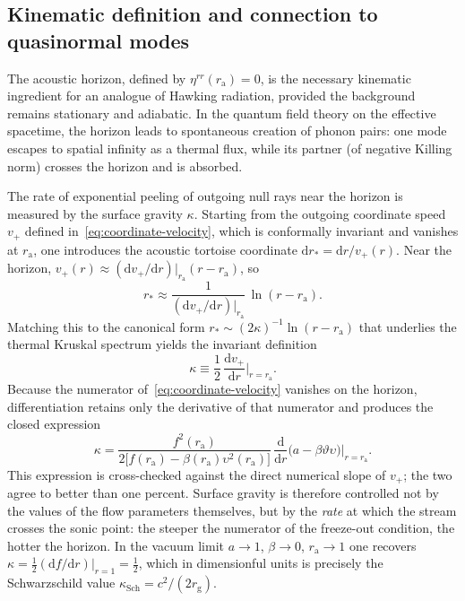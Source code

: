 \documentclass[12pt,a4paper,preprint]{elsarticle}
\begin{document}
        \subsection{Kinematic definition and connection to quasinormal modes}\label{subsec:kinematic-definition}
            The acoustic horizon, defined by $\eta^{rr}(r_{\mathrm{a}})=0$, is the necessary kinematic ingredient for an analogue of Hawking radiation, provided the background remains stationary and adiabatic. In the quantum field theory on the effective spacetime, the horizon leads to spontaneous creation of phonon pairs: one mode escapes to spatial infinity as a thermal flux, while its partner (of negative Killing norm) crosses the horizon and is absorbed.

            The rate of exponential peeling of outgoing null rays near the horizon is measured by the surface gravity $\kappa$. Starting from the outgoing coordinate speed $v_{+}$ defined in~\eqref{eq:coordinate-velocity}, which is conformally invariant and vanishes at $r_{\mathrm{a}}$, one introduces the acoustic tortoise coordinate $\mathrm{d}r_{*}=\mathrm{d}r/v_{+}(r)$. Near the horizon, $v_{+}(r)\approx (\mathrm{d}v_{+}/\mathrm{d}r)|_{r_{\mathrm{a}}}(r-r_{\mathrm{a}})$, so
            \begin{equation}
                r_{*} \approx \frac{1}{(\mathrm{d}v_{+}/\mathrm{d}r)|_{r_{\mathrm{a}}}}\,\ln(r-r_{\mathrm{a}}) .
                \label{eq:tortoise-near-horizon}
            \end{equation}
            Matching this to the canonical form $r_{*}\sim(2\kappa)^{-1}\ln(r-r_{\mathrm{a}})$ that underlies the thermal Kruskal spectrum yields the invariant definition
            \begin{equation}
                \kappa \equiv \frac{1}{2}\,\frac{\mathrm{d}v_{+}}{\mathrm{d}r}\Big|_{r=r_{\mathrm{a}}} .
                \label{eq:surface-gravity-def}
            \end{equation}
            Because the numerator of~\eqref{eq:coordinate-velocity} vanishes on the horizon, differentiation retains only the derivative of that numerator and produces the closed expression
            \begin{equation}
                \kappa = \frac{f^{2}(r_{\mathrm{a}})} {2\bigl[f(r_{\mathrm{a}})-\beta(r_{\mathrm{a}})\upsilon^{2}(r_{\mathrm{a}})\bigr]} \,\frac{\mathrm{d}}{\mathrm{d}r}\bigl(a-\beta\vartheta\upsilon\bigr)\Big|_{r=r_{\mathrm{a}}} .
                \label{eq:surface-gravity-explicit}
            \end{equation}
            This expression is cross-checked against the direct numerical slope of $v_{+}$; the two agree to better than one percent. Surface gravity is therefore controlled not by the values of the flow parameters themselves, but by the \emph{rate} at which the stream crosses the sonic point: the steeper the numerator of the freeze-out condition, the hotter the horizon. In the vacuum limit $a\to 1$, $\beta\to 0$, $r_{\mathrm{a}}\to 1$ one recovers $\kappa=\frac{1}{2}(\mathrm{d}f/\mathrm{d}r)|_{r=1}=\frac{1}{2}$, which in dimensionful units is precisely the Schwarzschild value $\kappa_{\mathrm{Sch}}=c^{2}/(2r_{\mathrm{g}})$.
\end{document}
